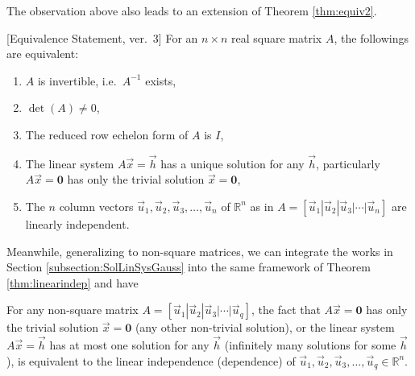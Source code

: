 The observation above also leads to an extension of Theorem \ref{thm:equiv2}.
\begin{thm}
\label{thm:equiv3}[Equivalence Statement, ver.\ 3]
For an $n \times n$ real square matrix $A$, the followings are equivalent:
\begin{enumerate}[label=(\alph*)]
\item $A$ is invertible, i.e.\ $A^{-1}$ exists,
\item $\det(A) \neq 0$,
\item The reduced row echelon form of $A$ is $I$,
\item The linear system $A\vec{x} = \vec{h}$ has a unique solution for any $\vec{h}$, particularly $A\vec{x} = \textbf{0}$ has only the trivial solution $\vec{x} = \textbf{0}$,
\item The $n$ column vectors $\vec{u}_1, \vec{u}_2, \vec{u}_3, \ldots, \vec{u}_n$ of $\mathbb{R}^n$ as in $A = [\vec{u}_1|\vec{u}_2|\vec{u}_3|\cdots|\vec{u}_n]$ are linearly independent.
\end{enumerate}
\end{thm}
Meanwhile, generalizing to non-square matrices, we can integrate the works in Section \ref{subsection:SolLinSysGauss} into the same framework of Theorem \ref{thm:linearindep} and have
\begin{thm}
\label{thm:nonsqlinearindep}
For any non-square matrix $A = [\vec{u}_1|\vec{u}_2|\vec{u}_3|\cdots|\vec{u}_q]$, the fact that $A\vec{x} = \textbf{0}$ has only the trivial solution $\vec{x} = \textbf{0}$ (any other non-trivial solution), or the linear system $A\vec{x} = \vec{h}$ has at most one solution for any $\vec{h}$ (infinitely many solutions for some $\vec{h}$), is equivalent to the linear independence (dependence) of $\vec{u}_1, \vec{u}_2, \vec{u}_3, \ldots, \vec{u}_q \in \mathbb{R}^n$.
\end{thm}

